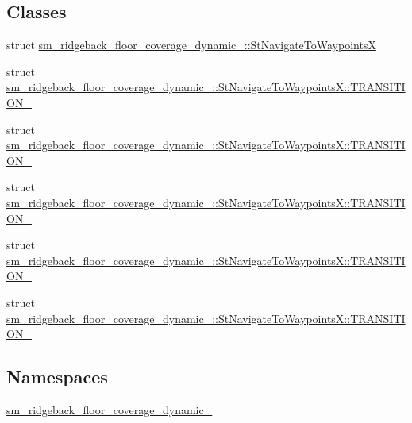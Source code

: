 \subsection*{Classes}
\begin{DoxyCompactItemize}
\item 
struct \hyperlink{structsm__ridgeback__floor__coverage__dynamic__1_1_1StNavigateToWaypointsX}{sm\+\_\+ridgeback\+\_\+floor\+\_\+coverage\+\_\+dynamic\+\_\+::\+St\+Navigate\+To\+WaypointsX}
\item 
struct \hyperlink{structsm__ridgeback__floor__coverage__dynamic__1_1_1StNavigateToWaypointsX_1_1TRANSITION__1}{sm\+\_\+ridgeback\+\_\+floor\+\_\+coverage\+\_\+dynamic\+\_\+::\+St\+Navigate\+To\+Waypoints\+X\+::\+T\+R\+A\+N\+S\+I\+T\+I\+O\+N\+\_}
\item 
struct \hyperlink{structsm__ridgeback__floor__coverage__dynamic__1_1_1StNavigateToWaypointsX_1_1TRANSITION__2}{sm\+\_\+ridgeback\+\_\+floor\+\_\+coverage\+\_\+dynamic\+\_\+::\+St\+Navigate\+To\+Waypoints\+X\+::\+T\+R\+A\+N\+S\+I\+T\+I\+O\+N\+\_}
\item 
struct \hyperlink{structsm__ridgeback__floor__coverage__dynamic__1_1_1StNavigateToWaypointsX_1_1TRANSITION__3}{sm\+\_\+ridgeback\+\_\+floor\+\_\+coverage\+\_\+dynamic\+\_\+::\+St\+Navigate\+To\+Waypoints\+X\+::\+T\+R\+A\+N\+S\+I\+T\+I\+O\+N\+\_}
\item 
struct \hyperlink{structsm__ridgeback__floor__coverage__dynamic__1_1_1StNavigateToWaypointsX_1_1TRANSITION__4}{sm\+\_\+ridgeback\+\_\+floor\+\_\+coverage\+\_\+dynamic\+\_\+::\+St\+Navigate\+To\+Waypoints\+X\+::\+T\+R\+A\+N\+S\+I\+T\+I\+O\+N\+\_}
\item 
struct \hyperlink{structsm__ridgeback__floor__coverage__dynamic__1_1_1StNavigateToWaypointsX_1_1TRANSITION__5}{sm\+\_\+ridgeback\+\_\+floor\+\_\+coverage\+\_\+dynamic\+\_\+::\+St\+Navigate\+To\+Waypoints\+X\+::\+T\+R\+A\+N\+S\+I\+T\+I\+O\+N\+\_}
\end{DoxyCompactItemize}
\subsection*{Namespaces}
\begin{DoxyCompactItemize}
\item 
 \hyperlink{namespacesm__ridgeback__floor__coverage__dynamic__1}{sm\+\_\+ridgeback\+\_\+floor\+\_\+coverage\+\_\+dynamic\+\_}
\end{DoxyCompactItemize}
